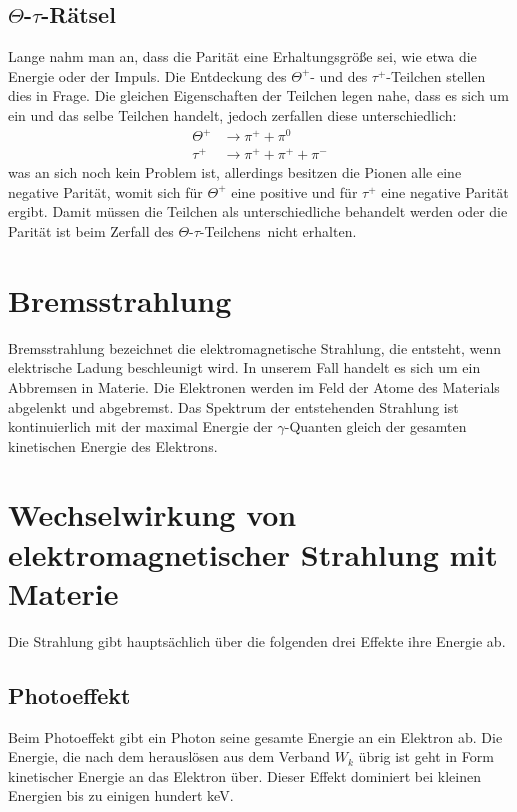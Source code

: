 \documentclass[twoside,colorback,accentcolor=tud4c,11pt]{tudreport}
\begin{document}
\subsection{$\Theta$-$\tau$-Rätsel}
Lange nahm man an, dass die Parität eine Erhaltungsgröße sei, wie etwa die Energie oder der Impuls. Die Entdeckung des $ \Theta^+ $- und des $ \tau^+ $-Teilchen stellen dies in Frage. Die gleichen Eigenschaften der Teilchen legen nahe, dass es sich um ein und das selbe Teilchen handelt, jedoch zerfallen diese unterschiedlich:
\begin{align}
\Theta^+&\rightarrow\pi^++\pi^0\\
\tau^+&\rightarrow\pi^++\pi^++\pi^-
\end{align}
was an sich noch kein Problem ist, allerdings besitzen die Pionen alle eine negative Parität, womit sich für $\Theta^+$ eine positive und für $\tau^+$ eine negative Parität ergibt. Damit müssen die Teilchen als unterschiedliche behandelt werden oder die Parität ist beim Zerfall des \glqq $\Theta$-$\tau$-Teilchens\grqq\, nicht erhalten.
\section{Bremsstrahlung}
Bremsstrahlung bezeichnet die elektromagnetische Strahlung, die entsteht, wenn elektrische Ladung beschleunigt wird. In unserem Fall handelt es sich um ein Abbremsen in Materie. Die Elektronen werden im Feld der Atome des Materials abgelenkt und abgebremst. Das Spektrum der entstehenden Strahlung ist kontinuierlich mit der maximal Energie der $ \gamma $-Quanten gleich der gesamten kinetischen Energie des Elektrons.
\section{Wechselwirkung von elektromagnetischer Strahlung mit Materie}
Die Strahlung gibt hauptsächlich über die folgenden drei Effekte ihre Energie ab.
\subsection{Photoeffekt}
Beim Photoeffekt gibt ein Photon seine gesamte Energie an ein Elektron ab. Die Energie, die nach dem herauslösen aus dem Verband $ W_k $ übrig ist geht in Form kinetischer Energie an das Elektron über. Dieser Effekt dominiert bei kleinen Energien bis zu einigen hundert keV.
\end{document}

